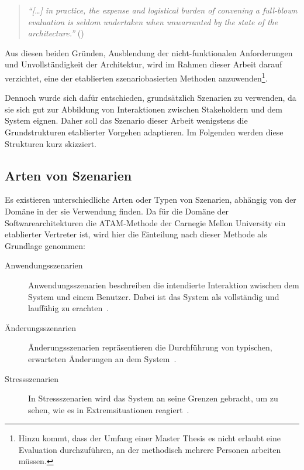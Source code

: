  \begin{quote}
    \emph{"`[\ldots] in practice, the expense and logistical burden of convening a full-blown evaluation is seldom undertaken when unwarranted by the state of the architecture."'} (\citep[S. 24]{evaluating_software_architectures})
  \end{quote}
  
  Aus diesen beiden Gründen, Ausblendung der nicht-funktionalen Anforderungen und Unvollständigkeit der Architektur, wird im Rahmen dieser Arbeit darauf verzichtet, eine der etablierten szenariobasierten Methoden anzuwenden\footnote{Hinzu kommt, dass der Umfang einer Master Thesis es nicht erlaubt eine Evaluation durchzuführen, an der methodisch mehrere Personen arbeiten müssen.}.
  
  Dennoch wurde sich dafür entschieden, grundsätzlich Szenarien zu verwenden, da sie sich gut zur Abbildung von Interaktionen zwischen Stakeholdern und dem System eignen. Daher soll das Szenario dieser Arbeit wenigstens die Grundstrukturen etablierter Vorgehen adaptieren. Im Folgenden werden diese Strukturen kurz skizziert.
  
\subsection{Arten von Szenarien} %
\label{sub:arten_von_szenarien}

  Es existieren unterschiedliche Arten oder Typen von Szenarien, abhängig von der Domäne in der sie Verwendung finden. Da für die Domäne der Softwarearchitekturen die ATAM-Methode der Carnegie Mellon University ein etablierter Vertreter ist, wird hier die Einteilung nach dieser Methode als Grundlage genommen:
  
  \begin{description}
    \item[Anwendungsszenarien] Anwendungsszenarien beschreiben die intendierte Interaktion zwischen dem System und einem Benutzer. Dabei ist das System als vollständig und lauffähig zu erachten~\cite[S. 14]{kazman2000ama}.
    \item[Änderungsszenarien] Änderungsszenarien repräsentieren die Durchführung von typischen, erwarteten Änderungen an dem System~\cite[S. 14f]{kazman2000ama}.
    \item[Stressszenarien] In Stressszenarien wird das System an seine Grenzen gebracht, um zu sehen, wie es in Extremsituationen reagiert~\cite[S. 15]{kazman2000ama}.
  \end{description}
  
